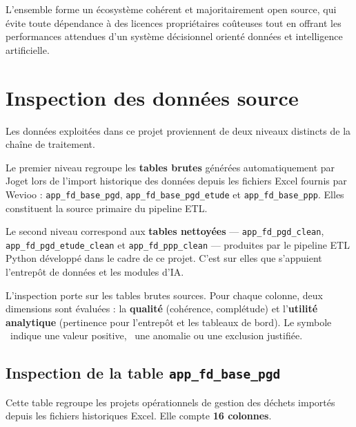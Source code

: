 L'ensemble forme un écosystème cohérent et majoritairement open
source, qui évite toute dépendance à des licences propriétaires
coûteuses tout en offrant les performances attendues d'un système
décisionnel orienté données et intelligence artificielle.

\section{Inspection des données source}

Les données exploitées dans ce projet proviennent de deux niveaux
distincts de la chaîne de traitement.

Le premier niveau regroupe les \textbf{tables brutes} générées
automatiquement par Joget lors de l'import historique des données
depuis les fichiers Excel fournis par Wevioo :
\texttt{app\_fd\_base\_pgd}, \texttt{app\_fd\_base\_pgd\_etude}
et \texttt{app\_fd\_base\_ppp}. Elles constituent la source
primaire du pipeline ETL.

Le second niveau correspond aux \textbf{tables nettoyées} —
\texttt{app\_fd\_pgd\_clean}, \texttt{app\_fd\_pgd\_etude\_clean}
et \texttt{app\_fd\_ppp\_clean} — produites par le pipeline ETL
Python développé dans le cadre de ce projet. C'est sur elles que
s'appuient l'entrepôt de données et les modules d'IA.

L'inspection porte sur les tables brutes sources. Pour chaque
colonne, deux dimensions sont évaluées : la \textbf{qualité}
(cohérence, complétude) et l'\textbf{utilité analytique}
(pertinence pour l'entrepôt et les tableaux de bord).
Le symbole \checkmark\ indique une valeur positive, \texttimes\
une anomalie ou une exclusion justifiée.

\subsection{Inspection de la table \texttt{app\_fd\_base\_pgd}}

Cette table regroupe les projets opérationnels de gestion des
déchets importés depuis les fichiers historiques Excel. Elle
compte \textbf{16 colonnes}.

